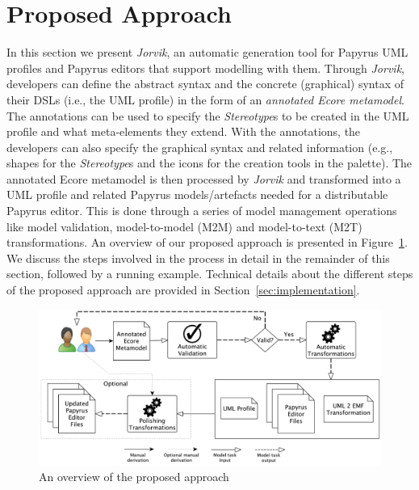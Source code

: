 \section{Proposed Approach}
\label{sec:approach}
In this section we present \textit{Jorvik}, an automatic generation tool for Papyrus UML profiles and Papyrus editors that support modelling with them.
Through \textit{Jorvik}, developers can define the abstract syntax and the concrete (graphical) syntax of their DSLs (i.e., the UML profile) in the form of an \textit{annotated Ecore metamodel}.
The annotations can be used to specify the \textit{Stereotype}s to be created in the UML profile and what meta-elements they extend. 
With the annotations, the developers can also specify the graphical syntax and related information (e.g., shapes for the \textit{Stereotype}s and the icons for the creation tools in the palette). 
The annotated Ecore metamodel is then processed by \textit{Jorvik} and transformed into a UML profile and related Papyrus models/artefacts needed for a distributable Papyrus editor. 
This is done through a series of model management operations like model validation, model-to-model (M2M) and model-to-text (M2T) transformations. 
An overview of our proposed approach is presented in Figure~\ref{fig:approachOverview}. 
We discuss the steps involved in the process in detail in the remainder of this section, followed by a running example. 
Technical details about the different steps of the proposed approach are provided in Section~\ref{sec:implementation}.

\begin{figure}
	\centering
	\includegraphics[width=1\textwidth]{diagrams/approachOverview.pdf}
	\caption{An overview of the proposed approach}
	\label{fig:approachOverview}
\end{figure}

